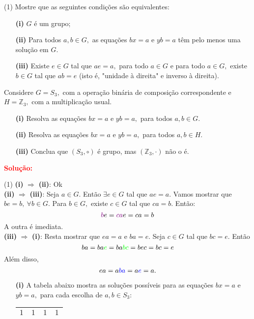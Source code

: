 \documentclass[12pt, a4paper]{article}
\newcommand{\negrito}[1]{\mbox{\boldmath{$#1$}}}
\begin{document}
\begin{tasks}[counter-format={(tsk[a])},label-width=3.6ex, label-format = {\bfseries}, column-sep = {0pt}](1)
\task[\textcolor{Floresta}{$\negrito{(a)} $}] Mostre que as seguintes condições são equivalentes:
\begin{itemize}
\item[\textbf{(i)}] $G$ é um grupo;
\item[\textbf{(ii)}] Para todos $a,b \in G,$ as equações $bx = a$ e $yb = a$  têm pelo menos uma solução em $G.$
\item[\textbf{(iii)}] Existe $e \in G$ tal que $ae = a,$ para todo $a \in G$ e para todo $a \in G,$ existe $b \in G$ tal que $ab = e$ (isto é, "unidade à direita" e inverso à direita).
\end{itemize}
\task[\textcolor{Floresta}{$\negrito{(b)} $}] Considere $G = S_3,$ com a operação binária de composição correspondente e $H = \mathbb{Z}_3,$ com a multiplicação usual. 
\begin{itemize}
\item[\textbf{(i)}] Resolva as equações $bx = a$ e $yb = a,$ para todos $a,b \in G.$
\item[\textbf{(ii)}] Resolva as equações $bx = a$ e $yb = a,$ para todos $a,b \in H.$
\item[\textbf{(iii)}] Conclua que $(S_3, \circ)$ é grupo, mas $(\mathbb{Z}_3, \cdot)$ não o é.
\end{itemize}
\end{tasks} 
\textbf{\textcolor{red}{Solução:}}
\begin{tasks}[counter-format={(tsk[a])},label-width=3.6ex, label-format = {\bfseries}, column-sep = {0pt}](1)
\task[\textcolor{Floresta}{$\negrito{(a)} $}] \textbf{(i)} $\Rightarrow$ \textbf{(ii)}: Ok \\ \textbf{(ii)} $\Rightarrow$ \textbf{(iii)}: Seja $a \in G.$ Então $\exists e \in G$ tal que $ae = a.$ Vamos mostrar que $be = b, \ \forall b \in G.$ Para $b \in G,$ existe $c \in G$ tal que $ca = b.$ Então:
\[
\textcolor{violet}{b}e = \textcolor{violet}{ca}e = ca = b
\] 
A outra é imediata.\\
\textbf{(iii)} $\Rightarrow$ \textbf{(i)}: Resta mostrar que $ea = a$ e $ba = e$. Seja $c \in G$ tal que $bc = e.$ Então\[
ba = ba\textcolor{green}{e} = ba\textcolor{green}{bc} = bec = bc = e\]
Além disso, \[ea = a\textcolor{blue}{ba} = a \textcolor{blue}{e} = a.\]
\task[\textcolor{Floresta}{$\negrito{(b)} $}]
\begin{itemize}
\item[\textbf{(i)}] A tabela abaixo mostra as soluções possíveis para as equações $bx = a$ e $yb = a,$ para cada escolha de $a,b \in S_3:$
\begin{tabular}{|c|c|c|c|}
\hline
$1$ & $1$ & $1$ & $1$ \\ \hline

\end{tabular}
\end{itemize}
\end{tasks}
\end{document}
